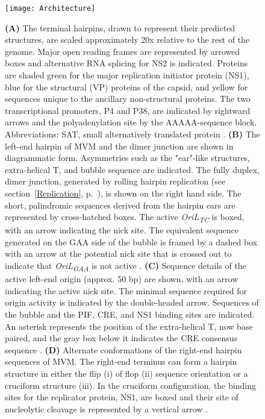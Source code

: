 \begin{figure}
\centering
  \texttt{[image: Architecture]}
  \vspace{-8em}
  \caption[Genome architecture of minute virus of mice (MVM).]
   {\textbf{(A)} The terminal hairpins, drawn to represent their predicted structures, are scaled approximately 20x relative to the rest of the genome. Major open reading frames are represented by arrowed boxes and alternative RNA splicing for NS2 is indicated. Proteins are shaded green for the major replication initiator protein (NS1), blue for the structural (VP) proteins of the capsid, and yellow for sequences unique to the ancillary non-structural proteins. The two transcriptional promoters, P4 and P38, are indicated by rightward arrows and the polyadenylation site by the AAAAA-sequence block. Abbreviations: SAT, small alternatively translated protein \cite{small}. \textbf{(B)} The left-end hairpin of MVM and the dimer junction are shown in diagrammatic form. Asymmetries such as the "ear"-like structures, extra-helical T, and bubble sequence are indicated. The fully duplex, dimer junction, generated by rolling hairpin replication (see section~\ref{Replication}, p.~\pageref{Replication}), is shown on the right hand side. The short, palindromic sequences derived from the hairpin ears are represented by cross-hatched boxes. The active \textit{OriL\textsubscript{TC}} is boxed, with an arrow indicating the nick site. The equivalent sequence generated on the GAA side of the bubble is framed by a dashed box with an arrow at the potential nick site that is crossed out to indicate that \textit{OriL\textsubscript{GAA}} is not active \cite{pmid12885883, pmid16928767}. \textbf{(C)} Sequence details of the active left-end origin (approx. 50 bp) are shown, with an arrow indicating the active nick site. The minimal sequence required for origin activity is indicated by the double-headed arrow. Sequences of the bubble and the PIF, CRE, and NS1 binding sites are indicated. An asterisk represents the position of the extra-helical T, now base paired, and the gray box below it indicates the CRE consensus sequence \cite{pmid12885883}. \textbf{(D)} Alternate conformations of the right-end hairpin sequences of MVM. The right-end terminus can form a hairpin structure in either the flip (i) of flop (ii) sequence orientation or a cruciform structure (iii). In the cruciform configuration, the binding sites for the replicator protein, NS1, are boxed and their site of nucleolytic cleavage is represented by a vertical arrow \cite{pmid8614999}.
} 
\label{Architecture}
\end{figure}


